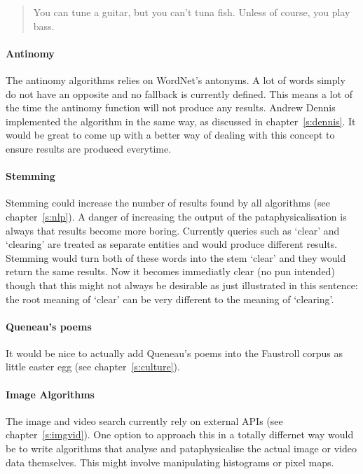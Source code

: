 \begin{quotation}
   You can tune a guitar, but you can't tuna fish. Unless of course, you play bass. 
\end{quotation}

\paragraph{Antinomy}
The antinomy algorithms relies on WordNet's antonyms. A lot of words simply do not have an opposite and no fallback is currently defined. This means a lot of the time the antinomy function will not produce any results. Andrew Dennis implemented the algorithm in the same way, as discussed in chapter~\ref{s:dennis}. It would be great to come up with a better way of dealing with this concept to ensure results are produced everytime.

\paragraph{Stemming}
Stemming could increase the number of results found by all algorithms (see chapter~\ref{s:nlp}). A danger of increasing the output of the pataphysicalisation is always that results become more boring. Currently queries such as `clear' and `clearing' are treated as separate entities and would produce different results. Stemming would turn both of these words into the stem `clear' and they would return the same results. Now it becomes immediatly clear (no pun intended) though that this might not always be desirable as just illustrated in this sentence: the root meaning of `clear' can be very different to the meaning of `clearing'.

\paragraph{Queneau's poems}
It would be nice to actually add Queneau's poems \autocite{Queneau1961} into the Faustroll corpus as little easter egg (see chapter~\ref{s:culture}).

\paragraph{Image Algorithms}
The image and video search currently rely on external \ac{API}s (see chapter~\ref{s:imgvid}). One option to approach this in a totally differnet way would be to write algorithms that analyse and pataphysicalise the actual image or video data themselves. This might involve manipulating histograms or pixel maps.

